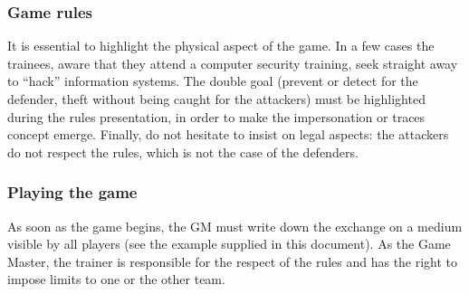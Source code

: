 \documentclass[11pt]{article} %
\begin{document}
\subsubsection{Game rules}
It is essential to highlight the physical aspect of the game. In a few cases
the trainees, aware that they attend a computer security training, seek straight away to 
``hack'' information systems. The double goal (prevent or detect for the defender, 
theft without being caught for the attackers) must be highlighted during the rules 
presentation, in order to make the impersonation or traces concept emerge. 
Finally, do not hesitate to insist on legal aspects: the attackers do not respect 
the rules, which is not the case of the defenders.


\subsubsection{Playing the game}
As soon as the game begins, the GM must write down the exchange on a medium 
visible by all players (see the example supplied in this document). As the Game Master, 
the trainer is responsible for the respect of the rules and has the right to impose limits 
to one or the other team.
\end{document}

